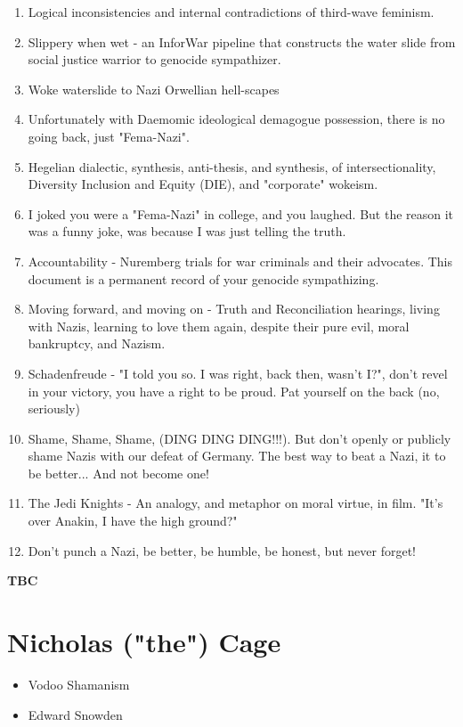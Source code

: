\documentclass[16pt,openany,oneside]{book}
\begin{document}
\begin{enumerate}
    \item Logical inconsistencies and internal contradictions of third-wave feminism.
    \item Slippery when wet - an InforWar pipeline that constructs the water slide from social justice warrior to genocide sympathizer.
    \item Woke waterslide to Nazi Orwellian hell-scapes 
    \item Unfortunately with Daemomic ideological demagogue possession, there is no going back, just "Fema-Nazi".
    \item Hegelian dialectic, synthesis, anti-thesis, and synthesis, of intersectionality, Diversity Inclusion and Equity (DIE), and "corporate" wokeism.
    \item I joked you were a "Fema-Nazi" in college, and you laughed. But the reason it was a funny joke, was because I was just telling the truth.
    \item Accountability - Nuremberg trials for war criminals and their advocates. This document is a permanent record of your genocide sympathizing.
    \item Moving forward, and moving on - Truth and Reconciliation hearings, living with Nazis, learning to love them again, despite their pure evil, moral bankruptcy, and Nazism.
    \item Schadenfreude - "I told you so. I was right, back then, wasn't I?", don't revel in your victory, you have a right to be proud. Pat yourself on the back (no, seriously)
    \item Shame, Shame, Shame, (DING DING DING!!!). But don't openly or publicly shame Nazis with our defeat of Germany. The best way to beat a Nazi, it to be better... And not become one!
    \item The Jedi Knights - An analogy, and metaphor on moral virtue, in film. "It's over Anakin, I have the high ground?"
    \item Don't punch a Nazi, be better, be humble, be honest, but never forget!
\end{enumerate}

\textbf{TBC}

\chapter{Nicholas ("the") Cage}

\begin{itemize}
    \item Vodoo Shamanism
    \item Edward Snowden \cite{snowden2019permanent}
\end{itemize}
\end{document}
